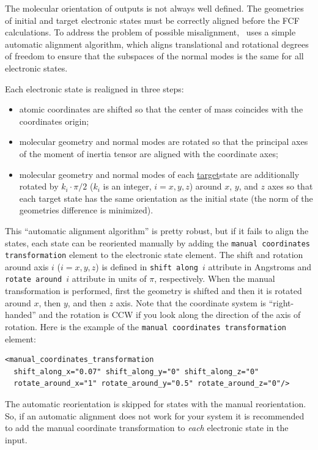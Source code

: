 \documentclass[11pt]{article}
\begin{document}
The molecular orientation of \ai outputs is not always well defined. 
The geometries of initial 
and target electronic states must be correctly aligned before the FCF calculations.
To address the problem of possible misalignment,
\ezFCF\ uses a simple automatic alignment algorithm, which aligns translational and rotational
degrees of freedom to ensure that the subspaces of the normal modes is the same for all electronic states.

Each electronic state is realigned in three steps:
\begin{itemize}
\item atomic coordinates are shifted so that the center of mass coincides with the coordinates origin;
\item molecular geometry and normal modes are rotated so that the principal axes of the moment of inertia 
tensor are aligned with the coordinate axes;
\item molecular geometry and normal modes of each \ul{target}{state} are additionally rotated by 
$k_i\cdot\pi/2$ ($k_i$ is an integer, $i={x,y,z}$) around $x$, $y$, and $z$ axes so that each target state has the same orientation 
as the initial state (the norm of the geometries difference is minimized).
\end{itemize}

This ``automatic alignment algorithm'' is pretty robust, but if it fails to align the states, each state can be reoriented 
manually by adding the {\tt manual coordinates transformation} element to the 
electronic state element.
The shift and rotation around axis $i$ ($i={x,y,z}$) is defined in {\tt shift along $i$} attribute in Angstroms
and {\tt rotate around $i$} attribute in units of $\pi$, respectively. 
When the manual transformation is performed, first the geometry is shifted and then it is rotated around $x$, then $y$, and then $z$ axis. 
Note that the coordinate system is ``right-handed'' and the rotation is CCW if you look along the 
direction of the axis of rotation. 
Here is the example of the {\tt manual coordinates transformation} element:
\begin{lstlisting}[frame=single,framerule=0pt]
<manual_coordinates_transformation 
  shift_along_x="0.07" shift_along_y="0" shift_along_z="0" 
  rotate_around_x="1" rotate_around_y="0.5" rotate_around_z="0"/>
\end{lstlisting}
The automatic reorientation is skipped for states with the manual reorientation.
So, if an automatic alignment does not work for your system it is recommended to add the
manual coordinate transformation to {\em each} electronic state in the \xml input.
\end{document}
